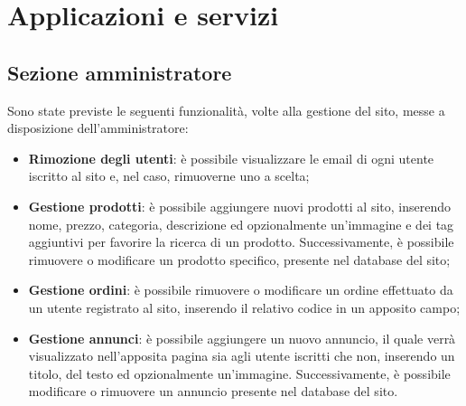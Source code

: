 \section{Applicazioni e servizi} %
	\subsection{Sezione amministratore}
	Sono state previste le seguenti funzionalità, volte alla gestione del sito, messe a disposizione dell'amministratore:
	\begin{itemize}
		\item \textbf{Rimozione degli utenti}: è possibile visualizzare le email di ogni utente iscritto al sito e, nel caso, rimuoverne uno a scelta;
		\item \textbf{Gestione prodotti}: è possibile aggiungere nuovi prodotti al sito, inserendo nome, prezzo, categoria, descrizione ed opzionalmente un'immagine e dei tag aggiuntivi per favorire la ricerca di un prodotto. Successivamente, è possibile rimuovere o modificare un prodotto specifico, presente nel database del sito;
		\item \textbf{Gestione ordini}: è possibile rimuovere o modificare un ordine effettuato da un utente registrato al sito, inserendo il relativo codice in un apposito campo;
		\item \textbf{Gestione annunci}: è possibile aggiungere un nuovo annuncio, il quale verrà visualizzato nell'apposita pagina sia agli utente iscritti che non, inserendo un titolo, del testo ed opzionalmente un'immagine. Successivamente, è possibile modificare o rimuovere un annuncio presente nel database del sito.
	\end{itemize}
	
